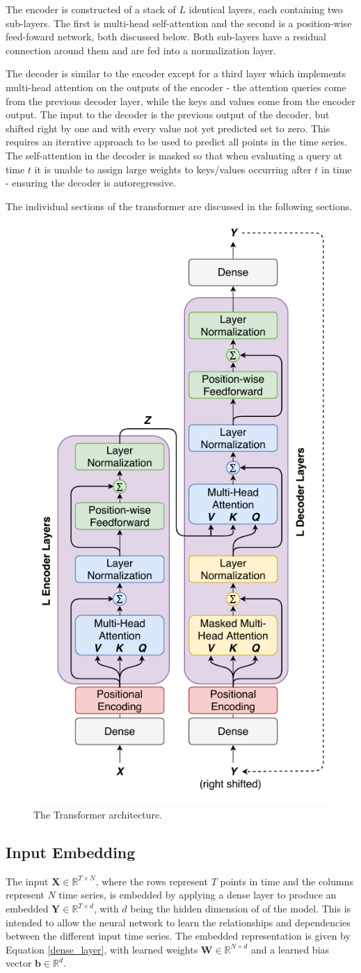 \documentclass[conference]{IEEEtran}
\begin{document}
The encoder is constructed of a stack of $L$ identical layers, each containing two sub-layers.
The first is multi-head self-attention and the second is a position-wise feed-foward network, both discussed below.
Both sub-layers have a residual connection around them and are fed into a normalization layer.

The decoder is similar to the encoder except for a third layer which implements multi-head attention on the outputs of the encoder - the attention queries come from the previous decoder layer, while the keys and values come from the encoder output.
The input to the decoder is the previous output of the decoder, but shifted right by one and with every value not yet predicted set to zero.
This requires an iterative approach to be used to predict all points in the time series.
The self-attention in the decoder is masked so that when evaluating a query at time $t$ it is unable to assign large weights to keys/values occurring after $t$ in time - ensuring the decoder is autoregressive.

The individual sections of the transformer are discussed in the following sections.

\begin{figure}[htbp]
	\centerline{\includegraphics[width=.35\textwidth]{images/transformer.pdf}}
	\caption{The Transformer architecture.}
	\label{fig:transformer}
\end{figure}

\subsection{Input Embedding}
The input $\boldsymbol{X} \in \mathbb{R}^{T \times N}$, where the rows represent $T$ points in time and the columns represent $N$ time series, is embedded by applying a dense layer to produce an embedded $\boldsymbol{Y} \in \mathbb{R}^{T \times d}$, with $d$ being the hidden dimension of of the model.
This is intended to allow the neural network to learn the relationships and dependencies between the different input time series.
The embedded representation is given by Equation \ref{dense_layer}, with learned weights $\boldsymbol{W} \in \mathbb{R}^{N \times d}$ and a learned bias vector $\boldsymbol{b} \in \mathbb{R}^{d}$.
\end{document}
